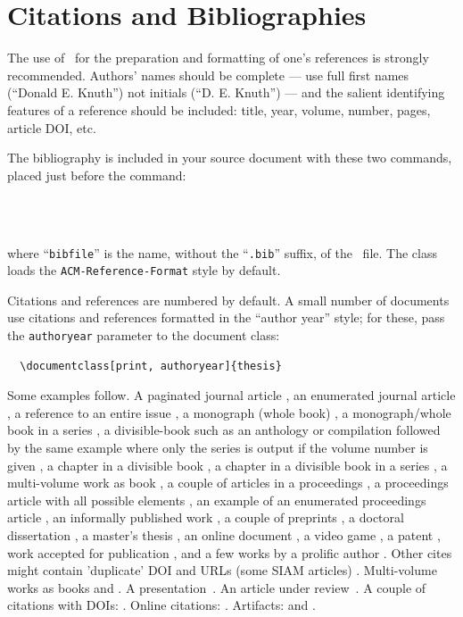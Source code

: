 \chapter{Citations and Bibliographies}
\label{ch:citations}

The use of \BibTeX\ for the preparation and formatting of one's
references is strongly recommended. Authors' names should be complete
--- use full first names (``Donald E. Knuth'') not initials
(``D. E. Knuth'') --- and the salient identifying features of a
reference should be included: title, year, volume, number, pages,
article DOI, etc.

The bibliography is included in your source document with these two
commands, placed just before the \verb|| command:
\begin{verbatim}
  
  
\end{verbatim}
where ``\verb|bibfile|'' is the name, without the ``\verb|.bib|''
suffix, of the \BibTeX\ file. The class loads the
\texttt{ACM-Reference-Format} style by default.

Citations and references are numbered by default. A small number of
documents use citations and references formatted in the ``author year''
style; for these, pass the \texttt{authoryear} parameter to the
document class:
\begin{verbatim}
  \documentclass[print, authoryear]{thesis}
\end{verbatim}

Some examples follow. A paginated journal article \cite{Abril07}, an
enumerated journal article \cite{Cohen07}, a reference to an entire
issue \cite{JCohen96}, a monograph (whole book) \cite{Kosiur01}, a
monograph/whole book in a series \cite{Harel79}, a divisible-book such
as an anthology or compilation \cite{Editor00} followed by the same
example where only the series is output if the volume number is given
\cite{Editor00a}, a chapter in a divisible book \cite{Spector90}, a
chapter in a divisible book in a series \cite{Douglass98}, a
multi-volume work as book \cite{Knuth97}, a couple of articles in a
proceedings \cite{Andler79, Hagerup1993}, a proceedings article with
all possible elements \cite{Smith10}, an example of an enumerated
proceedings article \cite{VanGundy07}, an informally published work
\cite{Harel78}, a couple of preprints \cite{Bornmann2019,
  AnzarootPBM14}, a doctoral dissertation \cite{Clarkson85}, a master's
thesis \cite{anisi03}, an online document \cite{Thornburg01,
  Ablamowicz07, Poker06}, a video game \cite{Obama08, Novak03, Lee05},
a patent \cite{JoeScientist001}, work accepted for publication
\cite{rous08}, and a few works by a prolific author \cite{SaeediMEJ10,
  SaeediJETC10}. Other cites might contain 'duplicate' DOI and URLs
(some SIAM articles) \cite{Kirschmer:2010:AEI:1958016.1958018}.
Multi-volume works as books \cite{MR781536} and \cite{MR781537}. A
presentation~\cite{Reiser2014}. An article under
review~\cite{Baggett2025}. A couple of citations with DOIs:
\cite{2004:ITE:1009386.1010128,Kirschmer:2010:AEI:1958016.1958018}.
Online citations: \cite{TUGInstmem, Thornburg01, CTANacmart}.
Artifacts: \cite{R} and \cite{UMassCitations}.
